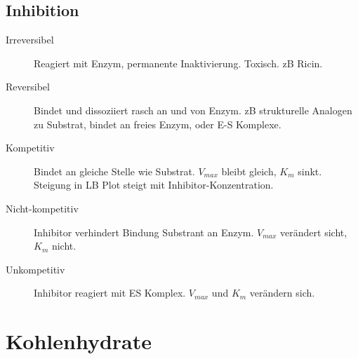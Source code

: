 \documentclass[a4paper,twocolumn,usegeometry,english,fontsize=6,DIV=16]{scrartcl}
\begin{document}
\subsection{Inhibition}

\begin{description}
	\item[Irreversibel] Reagiert mit Enzym, permanente Inaktivierung.
		Toxisch. zB Ricin.
	\item[Reversibel] Bindet und dissoziiert rasch an und von Enzym. zB
		strukturelle Analogen zu Substrat, bindet an freies Enzym, oder
		E-S Komplexe.
	\item[Kompetitiv] Bindet an gleiche Stelle wie Substrat. $V_{max}$
		bleibt gleich, $K_m$ sinkt. Steigung in LB Plot steigt mit
		Inhibitor-Konzentration.
	\item[Nicht-kompetitiv] Inhibitor verhindert Bindung Substrant an
		Enzym. $V_{max}$ verändert sicht, $K_m$ nicht.
	\item[Unkompetitiv] Inhibitor reagiert mit ES Komplex. $V_{max}$ und
		$K_m$ verändern sich.
\end{description}

\section{Kohlenhydrate}
\end{document}
